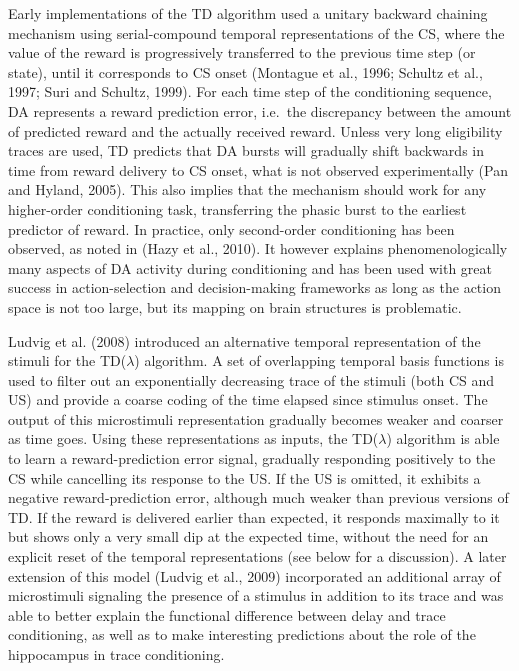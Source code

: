 \documentclass[
  11pt,
  a4paper,
]{scrbook}
\begin{document}
Early implementations of the TD algorithm used a unitary backward
chaining mechanism using serial-compound temporal representations of the
CS, where the value of the reward is progressively transferred to the
previous time step (or state), until it corresponds to CS onset
(Montague et al., 1996; Schultz et al., 1997; Suri and Schultz, 1999).
For each time step of the conditioning sequence, DA represents a reward
prediction error, i.e.~the discrepancy between the amount of predicted
reward and the actually received reward. Unless very long eligibility
traces are used, TD predicts that DA bursts will gradually shift
backwards in time from reward delivery to CS onset, what is not observed
experimentally (Pan and Hyland, 2005). This also implies that the
mechanism should work for any higher-order conditioning task,
transferring the phasic burst to the earliest predictor of reward. In
practice, only second-order conditioning has been observed, as noted in
(Hazy et al., 2010). It however explains phenomenologically many aspects
of DA activity during conditioning and has been used with great success
in action-selection and decision-making frameworks as long as the action
space is not too large, but its mapping on brain structures is
problematic.

Ludvig et al. (2008) introduced an alternative temporal representation
of the stimuli for the TD(\(\lambda\)) algorithm. A set of overlapping
temporal basis functions is used to filter out an exponentially
decreasing trace of the stimuli (both CS and US) and provide a coarse
coding of the time elapsed since stimulus onset. The output of this
microstimuli representation gradually becomes weaker and coarser as time
goes. Using these representations as inputs, the TD(\(\lambda\))
algorithm is able to learn a reward-prediction error signal, gradually
responding positively to the CS while cancelling its response to the US.
If the US is omitted, it exhibits a negative reward-prediction error,
although much weaker than previous versions of TD. If the reward is
delivered earlier than expected, it responds maximally to it but shows
only a very small dip at the expected time, without the need for an
explicit reset of the temporal representations (see below for a
discussion). A later extension of this model (Ludvig et al., 2009)
incorporated an additional array of microstimuli signaling the presence
of a stimulus in addition to its trace and was able to better explain
the functional difference between delay and trace conditioning, as well
as to make interesting predictions about the role of the hippocampus in
trace conditioning.
\end{document}
